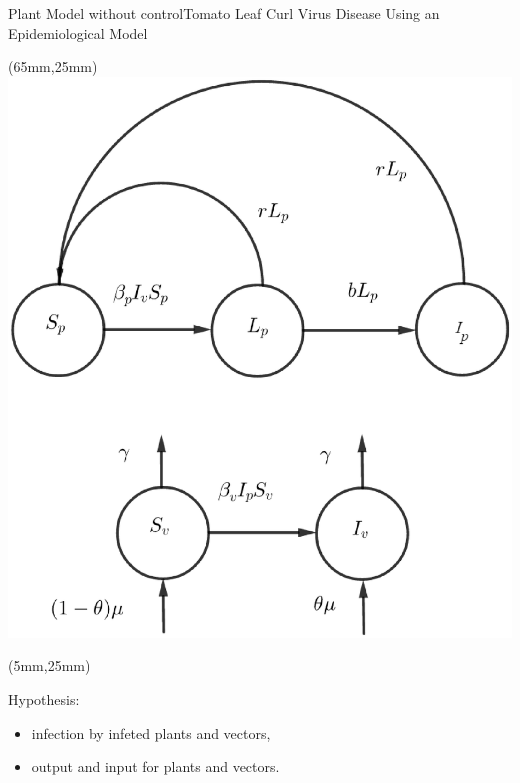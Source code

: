 	\begin{frame}{}
		\begin{bibunit}[abbrv]
			\nocite{Holt1999b}
			\putbib
		\end{bibunit}
	\end{frame}
	\begin{frame}{Plant Model without control}{Tomato Leaf Curl Virus Disease Using an Epidemiological Model}
		\begin{textblock*}{60mm}(65mm,25mm)
			\includegraphics[width=\linewidth]{Feathergraphics/plant_diagram.eps}
		\end{textblock*}
		\begin{textblock*}{55mm}(5mm,25mm)
			\begin{graybox}{Hypothesis:}
				
				\begin{itemize}
					\item infection by infeted plants and vectors,
					\item output and input for plants and vectors. 
				\end{itemize}
			\end{graybox}	
		\end{textblock*}
	\end{frame}
